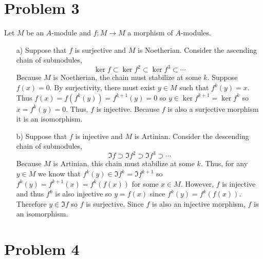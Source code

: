 \documentclass[12pt]{extarticle}
\begin{document}
\section{Problem 3}

Let $M$ be an $A$-module and $f : M \to M$ a morphism of $A$-modules.
\begin{enumerate}
\item[a)] Suppose that $f$ is surjective and $M$ is Noetherian. Consider the ascending chain of submodules,
\[ \ker{f} \subset \ker{f^2} \subset \ker{f^3} \subset \cdots \]
Because $M$ is Noetherian, the chain must stabilize at some $k$. Suppose $f(x) = 0$. By surjectivity, there must exist $y \in M$ such that $f^k(y) = x$. Thus $f(x) = f(f^k(y)) = f^{k+1}(y) = 0$ so $y \in \ker{f^{k+1}} = \ker{f^k}$ so $x =f^k(y) = 0$. Thus, $f$ is injective. Because $f$ is also a surjective morphism it is an isomorphism.

\item[b)] Suppose that $f$ is injective and $M$ is Artinian. Consider the descending chain of submodules,
\[ \Im{f} \supset \Im{f^2} \supset \Im{f^3} \supset \cdots \]
Because $M$ is Artinian, this chain must stabilize at some $k$. Thus, for any $y \in M$ we know that $f^{k}(y) \in \Im{f^{k}} = \Im{f^{k+1}}$ so $f^{k}(y) = f^{k+1}(x) = f^k(f(x))$ for some $x \in M$. However, $f$ is injective and thus $f^k$ is also injective so $y = f(x)$ since $f^k(y) = f^k(f(x))$. Therefore $y \in \Im{f}$ so $f$ is surjective. Since $f$ is also an injective morphism, $f$ is an isomorphism.    
\end{enumerate}

\section{Problem 4}
\end{document}
